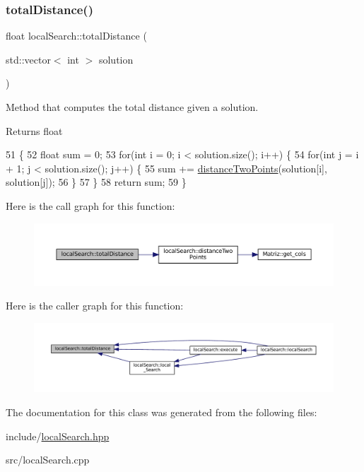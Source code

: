 \subsubsection{\texorpdfstring{total\+Distance()}{totalDistance()}}
{\footnotesize\ttfamily float local\+Search\+::total\+Distance (\begin{DoxyParamCaption}\item[{std\+::vector$<$ int $>$}]{solution }\end{DoxyParamCaption})}



Method that computes the total distance given a solution. 

\begin{DoxyReturn}{Returns}
float 
\end{DoxyReturn}

\begin{DoxyCode}
51                                                         \{
52   \textcolor{keywordtype}{float} sum = 0;
53   \textcolor{keywordflow}{for}(\textcolor{keywordtype}{int} i = 0; i < solution.size(); i++) \{
54     \textcolor{keywordflow}{for}(\textcolor{keywordtype}{int} j = i + 1; j < solution.size(); j++) \{
55       sum += \hyperlink{classlocalSearch_a5e85839cfb397c2ee38fa38bfbbc4151}{distanceTwoPoints}(solution[i], solution[j]);
56     \}
57   \}
58   \textcolor{keywordflow}{return} sum;
59 \}
\end{DoxyCode}
Here is the call graph for this function\+:
\nopagebreak
\begin{figure}[H]
\begin{center}
\leavevmode
\includegraphics[width=350pt]{classlocalSearch_a0b14e5f24760de3ea567ff507d3a2ece_cgraph}
\end{center}
\end{figure}
Here is the caller graph for this function\+:
\nopagebreak
\begin{figure}[H]
\begin{center}
\leavevmode
\includegraphics[width=350pt]{classlocalSearch_a0b14e5f24760de3ea567ff507d3a2ece_icgraph}
\end{center}
\end{figure}


The documentation for this class was generated from the following files\+:\begin{DoxyCompactItemize}
\item 
include/\hyperlink{localSearch_8hpp}{local\+Search.\+hpp}\item 
src/local\+Search.\+cpp\end{DoxyCompactItemize}
